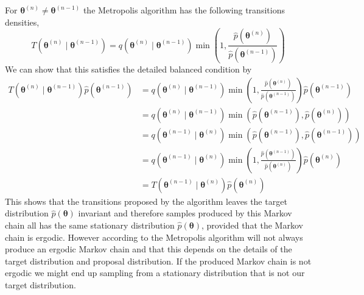 For $\boldsymbol{\theta}^{(n)}\neq \boldsymbol{\theta}^{(n-1)}$ the Metropolis algorithm has the following transitions densities,
\begin{equation*}
    T\left(\boldsymbol{\theta}^{(n)} \mid \boldsymbol{\theta}^{(n-1)}\right)=q\left(\boldsymbol{\theta}^{(n)} \mid \boldsymbol{\theta}^{(n-1)}\right) \min \left(1, \frac{\hat{p}\left(\boldsymbol{\theta}^{(n)}\right)}{ \hat{p}(\boldsymbol{\theta}^{(n-1)})}\right)
\end{equation*}
We can show that this satisfies the detailed balanced condition by
\begin{equation*}
\begin{aligned}
T\left(\boldsymbol{\theta}^{(n)} \mid \boldsymbol{\theta}^{(n-1)}\right) \hat{p}(\boldsymbol{\theta}^{(n-1)}) &=q\left(\boldsymbol{\theta}^{(n)} \mid \boldsymbol{\theta}^{(n-1)}\right) \min \left(1,\frac{ \hat{p}\left(\boldsymbol{\theta}^{(n)}\right) }{ \hat{p}(\boldsymbol{\theta}^{(n-1)})}\right) \hat{p}(\boldsymbol{\theta}^{(n-1)}) \\
&=q\left(\boldsymbol{\theta}^{(n)} \mid \boldsymbol{\theta}^{(n-1)}\right) \min \left(\hat{p}(\boldsymbol{\theta}^{(n-1)}), \hat{p}\left(\boldsymbol{\theta}^{(n)}\right)\right) \\
&=q\left(\boldsymbol{\theta}^{(n-1)} \mid \boldsymbol{\theta}^{(n)}\right) \min \left(\hat{p}\left(\boldsymbol{\theta}^{(n-1)}\right), \hat{p}(\boldsymbol{\theta}^{(n-1)})\right) \\
&=q\left(\boldsymbol{\theta}^{(n-1)} \mid \boldsymbol{\theta}^{(n)}\right) \min \left(1, \frac{\hat{p}(\boldsymbol{\theta}^{(n-1)}) }{ \hat{p}\left(\boldsymbol{\theta}^{(n)}\right)}\right) \hat{p}\left(\boldsymbol{\theta}^{(n)}\right) \\
&=T\left(\boldsymbol{\theta}^{(n-1)} \mid \boldsymbol{\theta}^{(n)}\right) \hat{p}\left(\boldsymbol{\theta}^{(n)}\right)
\end{aligned}
\end{equation*}
This shows that the transitions proposed by the algorithm leaves the target distribution $\hat{p}(\boldsymbol{\theta})$ invariant and therefore samples produced by this Markov chain all has the same stationary distribution $\hat{p}(\boldsymbol{\theta})$, provided that the Markov chain is ergodic. However according to \cite{neal2012bayesian} the Metropolis algorithm will not always produce an ergodic Markov chain and that this depends on the details of the target distribution and proposal distribution. If the produced Markov chain is not ergodic we might end up sampling from a stationary distribution that is not our target distribution.

